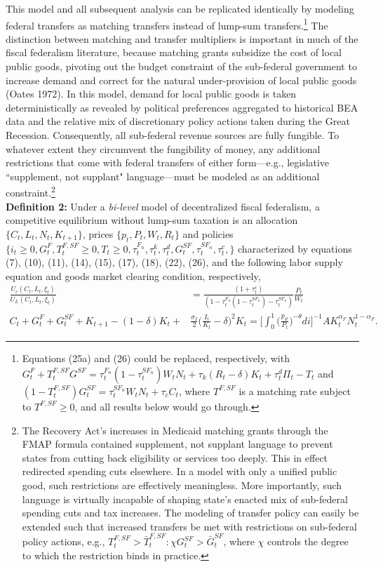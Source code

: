 \documentclass[12pt,letterpaper]{article}
\begin{document}
This model and all subsequent analysis can be replicated identically by modeling federal transfers as matching transfers instead of lump-sum transfers.\footnote{Equations (25a) and (26) could be replaced, respectively,  with $ G^F_t + T^{F,SF}_t G^{SF} = \tau^{F_n}_t (1 - \tau^{SF_n}_t) W_t N_t + \tau_k (R_t - \delta) K_t + \tau_t^d \Pi_t - T_t $ and $(1 - T^{F,SF}_t ) G^{SF}_t = \tau^{SF_n}_t W_t N_t + \tau_c C_t $, where $T^{F,SF}$ is a matching rate subject to $T^{F,SF} \geq 0 $, and all results below would go through.} The distinction between matching and transfer multipliers is important in much of the fiscal federalism literature, because matching grants subsidize the cost of local public goods, pivoting out the budget constraint of the sub-federal government to increase demand and correct for the natural under-provision of local public goods (Oates 1972). In this model, demand for local public goods is taken deterministically as revealed by political preferences aggregated to historical BEA data and the relative mix of discretionary policy actions taken during the Great Recession. Consequently, all sub-federal revenue sources are fully fungible. To whatever extent they circumvent the fungibility of money, any additional restrictions that come with federal transfers of either form---e.g., legislative ``supplement, not supplant" language---must be modeled as an additional constraint.\footnote{The Recovery Act's increases in Medicaid matching grants through the FMAP formula contained supplement, not supplant language to prevent states from cutting back eligibility or services too deeply. This in effect redirected spending cuts elsewhere. In a model with only a unified public good, such restrictions are effectively meaningless. More importantly, such language is virtually incapable of shaping state's enacted mix of sub-federal spending cuts and tax increases. The modeling of transfer policy can easily be extended such that increased transfers be met with restrictions on sub-federal policy actions, e.g., $T^{F,SF}_t > \bar{T}^{F,SF}_t : \chi G^{SF}_t > \bar{G}^{SF}_t $, where $\chi$ controls the degree to which the restriction binds in practice.} \\

\noindent \textbf{Definition 2: } Under a \textit{bi-level} model of decentralized fiscal federalism, a competitive equilibrium without lump-sum taxation is an allocation $\{C_t, L_t, N_t, K_{t+1}\}$, prices $\{p_t, P_t, W_t, R_t\}$ and policies $\{i_t \geq 0, G^F_t, T_t^{F,SF} \geq 0, T_t \geq 0, \tau_t^{F_n}, \tau_t^k, \tau_t^d, G^{SF}_t, \tau_t^{{SF}_n}, \tau_t^c,\}$ characterized by equations (7), (10), (11), (14), (15), (17), (18), (22), (26), and the following labor supply equation and goods market clearing condition, respectively,
\begin{align}
\frac{U_c (C_t, L_t, \xi_t )}{U_L (C_t, L_t, \xi_t )} &= \frac{(1+\tau_t^c)}{(1 - \tau^{F_n}_t (1 - \tau^{{SF}_n}_t) - \tau^{{SF}_n}_t)} \frac{P_t}{W_t} \\
C_{t} + G^F_{t} + G^{SF}_{t} + K_{t+1} - (1-\delta)K_t +  &\frac{\sigma_I}{2} \Big(\frac{I_t}{K_t} -\delta \Big)^2 K_t = \Big[ \int_0^1  \Big( \frac{p_{it}}{P_t} \Big) ^{-\theta} di \Big]^{-1} A K_t ^{\alpha_F} N_t ^{1-\alpha_F}.
\end{align}
\end{document}
